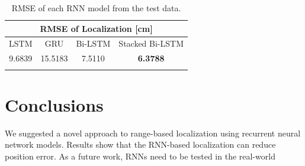 \documentclass[letterpaper, 10 pt, conference]{ieeeconf}  %
\begin{document}
\begin{table}[h]
	\centering
	\caption{RMSE of each RNN model from the test data.}
	\begin{tabular}{cccc}
		\hline
		\multicolumn{4}{c}{RMSE of Localization {[}cm{]}}                                          \\ \hline
		LSTM                 & GRU              & Bi-LSTM                  & Stacked Bi-LSTM        \\
		9.6839               & 15.5183              & 7.5110                    & \textbf{6.3788}                    \\ \hline
		\multicolumn{1}{l}{} & \multicolumn{1}{l}{} & \multicolumn{1}{l}{} & \multicolumn{1}{l}{}
		
	\end{tabular}
	
	\label{table:rmse}
	
\end{table}

\section{Conclusions}

We suggested a novel approach to range-based localization using recurrent neural network models. Results show that the RNN-based localization can reduce position error. As a future work, RNNs need to be tested in the real-world



\end{document}

